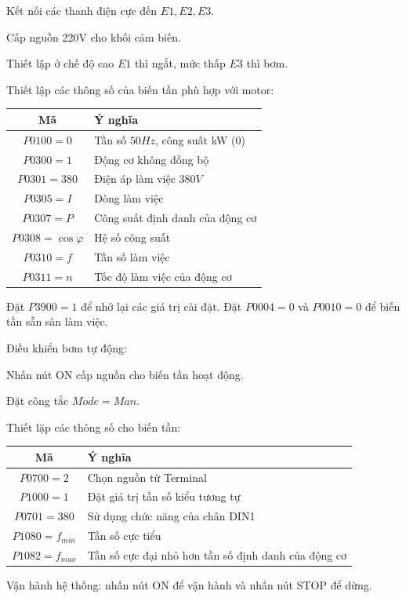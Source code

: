 \documentclass[13pt,a4paper]{extarticle}
\begin{document}
\begin{list}{--}{}
\begin{list}{+}{}
\item Kết nối các thanh điện cực đến $E1,E2,E3$.
\item Cấp nguồn 220V cho khối cảm biến.
\item Thiết lập ở chế độ cao $E1$ thì ngắt, mức thấp $E3$ thì bơm.
\item Thiết lập các thông số của biến tần phù hợp với motor:
\begin{center}
\begin{tabular}{|c|l|}\hline
Mã & Ý nghĩa\\ \hline
$P0100 = 0$ & Tần số $50Hz$, công suất kW (0)\\ \hline
$P0300 = 1$ & Động cơ không đồng bộ \\ \hline
$P0301 = 380$ & Điện áp làm việc $380V$\\ \hline
$P0305 = I$ & Dòng làm việc \\ \hline
$P0307 = P$ & Công suất định danh của động cơ\\ \hline
$P0308 = \cos \varphi$ & Hệ số công suất \\ \hline
$P0310 = f$ & Tần số làm việc \\ \hline
$P0311 = n$ & Tốc độ làm việc của động cơ \\ \hline
\end{tabular}
\end{center}
\item Đặt $P3900 = 1$ để nhớ lại các giá trị cài đặt. Đặt $P0004 = 0 $ và $P0010 = 0$ để biến tần sẵn sàn làm việc.
\end{list}
\item Điều khiển bơm tự động:
\begin{list}{+}{}
\item Nhấn nút ON cấp nguồn cho biến tần hoạt động. 
\item Đặt công tắc $Mode = Man$.
\item Thiết lặp các thông số cho biến tần:
\begin{center}
\begin{tabular}{|c|l|}\hline
Mã & Ý nghĩa\\ \hline
$P0700 = 2$ & Chọn nguồn từ Terminal\\ \hline
$P1000 = 1$ & Đặt giá trị tần số kiểu tương tự \\ \hline
$P0701 = 380$ & Sử dụng chức năng của chân DIN1\\ \hline
$P1080 = f_{min}$ & Tần số cực tiểu \\ \hline
$P1082 = f_{max}$ & Tần số cực đại nhỏ hơn tần số định danh của động cơ\\ \hline
\end{tabular}
\end{center}
\end{list}
\item Vận hành hệ thống: nhấn nút ON để vận hành và nhấn nút STOP để dừng.
\end{list}
\end{document}
